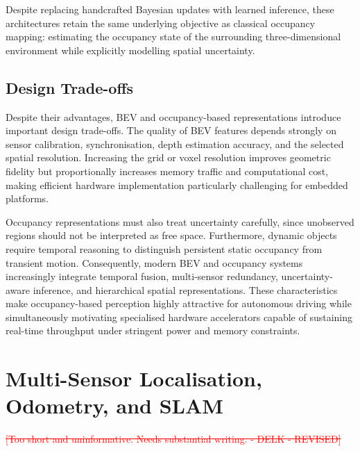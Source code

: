 \documentclass[11pt,oneside,openany]{book}
\newcommand{\added}[1]{\textcolor{RevisionBlue}{#1}}
\newcommand{\deleted}[1]{\textcolor{red}{\sout{#1}}}
\begin{document}
Despite replacing handcrafted Bayesian updates with learned inference, these architectures retain the same underlying objective as classical occupancy mapping: estimating the occupancy state of the surrounding three-dimensional environment while explicitly modelling spatial uncertainty.

\subsection{Design Trade-offs}

Despite their advantages, BEV and occupancy-based representations introduce important design trade-offs. The quality of BEV features depends strongly on sensor calibration, synchronisation, depth estimation accuracy, and the selected spatial resolution. Increasing the grid or voxel resolution improves geometric fidelity but proportionally increases memory traffic and computational cost, making efficient hardware implementation particularly challenging for embedded platforms.

Occupancy representations must also treat uncertainty carefully, since unobserved regions should not be interpreted as free space. Furthermore, dynamic objects require temporal reasoning to distinguish persistent static occupancy from transient motion. Consequently, modern BEV and occupancy systems increasingly integrate temporal fusion, multi-sensor redundancy, uncertainty-aware inference, and hierarchical spatial representations. These characteristics make occupancy-based perception highly attractive for autonomous driving while simultaneously motivating specialised hardware accelerators capable of sustaining real-time throughput under stringent power and memory constraints.

\section{Multi-Sensor Localisation, Odometry, and SLAM}
\deleted{[Too short and uninformative. Needs substantial writing. - DELK - REVISED]}

\end{document}

